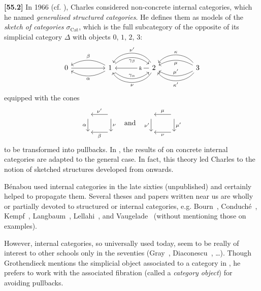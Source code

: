 \documentclass[a4paper,fleqn]{article}
\theoremstyle{plain}
\theoremstyle{definition}
\newenvironment{longcomm}[1]
  {\noindent\textbf{[#1]}\rmfamily}
  {}
\newcommand{\textand}{\quad\text{and}\quad}
\begin{document}
\begin{longcomm}{55.2}
  In 1966 (cf. \cite{coll104,coll93}), Charles considered non-concrete internal categories, which he named \emph{generalised structured categories}.
  He defines them as models of the \emph{sketch of categories $\sigma_{\mathrm{Cat}}$}, which is the full subcategory of the opposite of its simplicial category $\Delta$ with objects $0$, $1$, $2$, $3$:
  \[
    \begin{tikzcd}[sep=huge]
      0
        \ar[r]
      & 1
        \ar[l,bend left=30,"\alpha"]
        \ar[l,bend right=30,swap,"\beta"]
        \ar[r,bend left=40,swap,"\gamma_\beta"]
        \ar[r,bend right=40,"\gamma_\alpha"]
      & 2
        \ar[l,near start,swap,"k"description]
        \ar[l,bend left=60,"\nu"]
        \ar[l,bend right=60,swap,"\nu'"]
      & 3
        \ar[l,bend left=30,swap,"\mu'"]
        \ar[l,bend right=30,"\mu"]
        \ar[l,bend left=50,"\kappa'"]
        \ar[l,bend right=50,swap,"\kappa"]
    \end{tikzcd}
  \]
  equipped with the cones
  \[
    \begin{tikzcd}
      {} \ar[d,swap,"\alpha"]
      & {} \ar[l,swap,"\nu'"] \ar[d,"\nu"]
    \\{}
      & {} \ar[l,"\beta"]
    \end{tikzcd}
    \textand
    \begin{tikzcd}
      {} \ar[d,swap,"\nu'"]
      & {} \ar[l,swap,"\mu"] \ar[d,"\mu'"]
    \\{}
      & {} \ar[l,"\nu"]
    \end{tikzcd}
  \]
  to be transformed into pullbacks.
  In \cite{coll113,coll115}, the results of \cite{109} on concrete internal categories are adapted to the general case.
  In fact, this theory led Charles to the notion of sketched structures developed from \cite{coll106} onwards.

  Bénabou used internal categories in the late sixties (unpublished) and certainly helped to propagate them.
  Several theses and papers written near us are wholly or partially devoted to structured or internal categories, e.g. Bourn~\cite{comm13}, Conduché~\cite{comm22}, Kempf~\cite{comm60}, Langbaum~\cite{comm63}, Lellahi~\cite{comm69}, and Vaugelade~\cite{comm97} (without mentioning those on examples).

  However, internal categories, so universally used today, seem to be really of interest to other schools only in the seventies (Gray~\cite{comm39}, Diaconescu~\cite{comm26}, \ldots).
  Though Grothendieck mentions the simplicial object associated to a category in \cite{comm42}, he prefers to work with the associated fibration (called a \emph{category object}) for avoiding pullbacks.
\end{longcomm}
\end{document}
